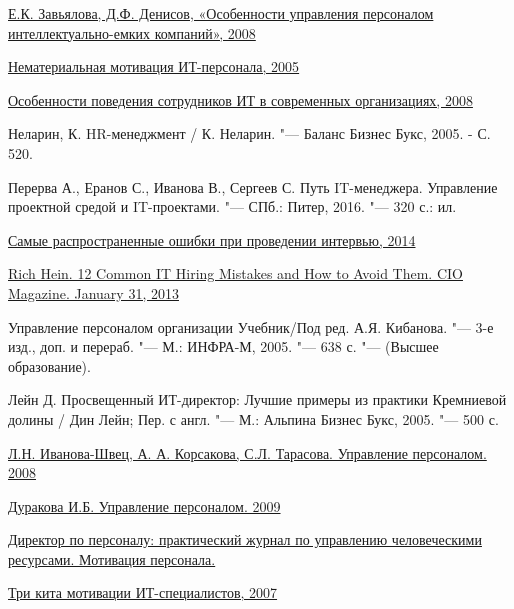 \documentclass{../industrial-development}
\begin{document}
\begin{thebibliography}{99}
 \href{https://cyberleninka.ru/article/v/osobennosti-upravleniya-personalom-intellektualno-emkih-kompaniy}{Е.К. Завьялова, Д.Ф. Денисов, «Особенности управления персоналом интеллектуально-емких компаний», 2008}

 \href{http://hr-portal.ru/article/nematerialnaya-motivaciya-it-personala
}{Нематериальная мотивация ИТ-персонала, 2005}


 \href{http://www.0ck.ru/menedzhment_i_trudovye_otnosheniya/osobennosti_povedeniya_sotrudnikov_it_v.html}{Особенности поведения сотрудников ИТ в современных организациях, 2008}

 Неларин, К. HR-менеджмент / К. Неларин. "--- Баланс Бизнес Букс, 2005. - С. 520.

 Перерва А., Еранов С., Иванова В., Сергеев С. Путь IT-менеджера. Управление проектной средой и IT-проектами. "--- СПб.: Питер, 2016. "--- 320 с.: ил.

 \href{http://bishelp.ru/business/personal/samye-rasprostranennye-oshibki-pri-provedenii-intervyu}{Самые распространенные ошибки при проведении интервью, 2014}

 \href{https://www.osp.ru/cio/2013/08/13036953/}{Rich Hein. 12 Common IT Hiring Mistakes and How to Avoid Them. CIO Magazine. January 31, 2013}

 Управление персоналом организации Учебник/Под ред. А.Я. Кибанова. "--- 3-е изд., доп. и перераб. "--- М.: ИНФРА-М, 2005. "--- 638 с. "--- (Высшее образование).

 Лейн Д. Просвещенный ИТ-директор: Лучшие примеры из практики Кремниевой долины / Дин Лейн; Пер. с англ. "--- М.: Альпина Бизнес Букс, 2005. "--- 500 с.

 \href{http://finances.social/upravlenie-personalom_709/modeli-upravleniya-personalom-33032.html} {Л.Н. Иванова-Швец, А. А. Корсакова, С.Л. Тарасова. Управление персоналом. 2008}

 \href{https://textbooks.studio/menedjment-upravlenie-personalom/osnovnyie-elementyi-planirovaniya-26893.html}{Дуракова И.Б. Управление персоналом. 2009}

 \href{https://www.hr-director.ru/rubric/6507-motivatsiya-personala}{Директор по персоналу: практический журнал по управлению человеческими ресурсами. Мотивация персонала.}

 \href{https://www.osp.ru/cio/2007/08/4326047/}{Три кита мотивации ИТ-специалистов, 2007}


\end{thebibliography}
\end{document}
